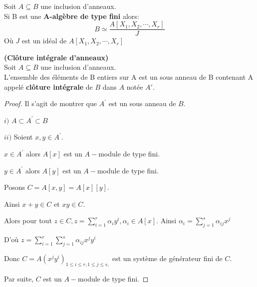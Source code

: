 \begin{maproposition}
	Soit $A \subseteq B$ une inclusion d'anneaux.\\
	Si B est une \textbf{A-algèbre de type fini} alors:
	\[ B \simeq \dfrac{A[X_1, X_2, \cdots, X_r]}{J} \]
	Où $J$ est un idéal de $A[X_1, X_2, \cdots, X_r]$
\end{maproposition}
\begin{moncorollaire}\textbf{(Clôture intégrale d'anneaux)}\cite{2}\\
	Soit $A \subseteq B$ une inclusion d'anneaux.\\
	L'ensemble des éléments de B entiers sur A est un sous anneau de B contenant A appelé \textbf{clôture intégrale} de $B$ dans $A$ notée $A'$.
\end{moncorollaire}
\begin{proof}
	Il s'agit de montrer que $A^{\prime }$ est un sous anneau de $B.$
	
	$i)$ $A\subset A^{\prime }\subset B$
	
	$ii)$ Soient $x,y\in A^{\prime }.$
	
	$x\in A^{\prime }$ alors $A[x]$ est un $A-$module de type fini.
	
	$y\in A^{\prime }$ alors $A[y]$ est un $A-$module de type fini.
	
	Posons $C=A[x,y]=A[x][y].$
	
	Ainsi $x+y\in C$ et $xy\in C$.
	
	Alors pour tout $z\in C,z=\sum\limits_{i=1}^{r}\alpha _{i}y^{i},\alpha
	_{i}\in A[x].$ Ainsi $\alpha _{i}=\sum\limits_{j=1}^{s}\alpha _{ij}x^{j}$
	
	D'où $z=\sum\limits_{i=1}^{r}\sum\limits_{j=1}^{s}\alpha _{ij}x^{j}y^{i}$
	
	Donc $C=A(x^{j}y^{i})_{1\leq i\leq r,1\leq j\leq s,}$ est un système de générateur fini de $C.$
	
	Par suite, $C$ est un $A-$module de type fini.
\end{proof}

